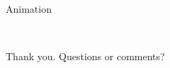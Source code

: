 \documentclass[10pt]{beamer}
\begin{document}
\begin{frame}{Animation}

\begin{center}
         \\
\end{center}

\end{frame}


\begin{frame}
 \hspace{2cm} Thank you. Questions or comments?
\end{frame}
\end{document}
